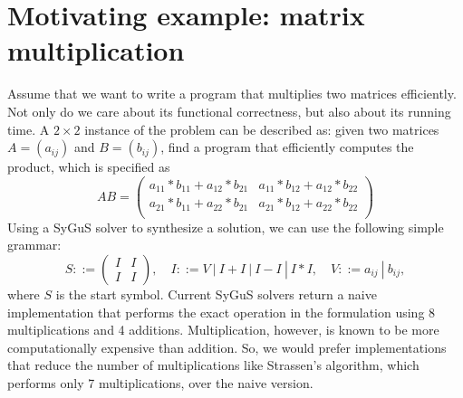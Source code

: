 \section{Motivating example: matrix multiplication}
\label{sec:example}

Assume that we want to write a program that multiplies two matrices efficiently. 
%
Not only do we care about its functional correctness, but also about its running time.
%
A $2 \times 2$ instance of the problem can be described as: given two matrices $A = (a_{ij})$ and $B = (b_{ij})$, find a program that efficiently computes the product, which is specified as
%
\begin{equation}
    AB =
\begin{pmatrix}
a_{11} * b_{11} + a_{12} * b_{21} &
a_{11} * b_{12} + a_{12} * b_{22} \\
a_{21} * b_{11} + a_{22} * b_{21} &
a_{21} * b_{12} + a_{22} * b_{22} \\
\end{pmatrix}
\label{eqn:matrix-mul}
\end{equation}
%
%
Using a SyGuS solver to synthesize a solution, we can use the following simple grammar:
%
\[
S ::=
\begin{pmatrix} I & I \\
I & I
\end{pmatrix}, \quad
I ::= V \ | \ I + I \ | \ I - I \ | \ I * I, \quad
V ::= a_{ij} \ | \ b_{ij},
\]
%
where $S$ is the start symbol.
%
Current SyGuS solvers return a naive implementation that performs the exact operation in the formulation using 8 multiplications and 4 additions.
%
Multiplication, however, is known to be more computationally expensive than addition.
%
So, we would prefer implementations that reduce the number of multiplications like Strassen's algorithm, which performs only 7 multiplications, over the naive version.
%
